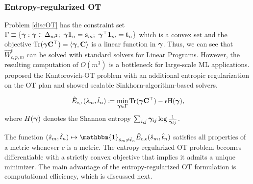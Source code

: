 \subsubsection{Entropy-regularized OT}\label{entOT} Problem \ref{discOT} has the constraint set $\Gamma\equiv \{ \bm{\gamma}: \bm{\gamma} \in \Delta_{m^2}; \ \bm{\gamma} \mathbf{1}_n = \mathbf{s}_m;\ \bm{\gamma}^\top \mathbf{1}_m = \mathbf{t}_n \}$ which is a convex set and the objective $\rm{Tr}(\bm{\gamma}\mathbf{C}^\top)=\langle \bm{\gamma}, \mathbf{C} \rangle$ is a linear function in $\bm{\gamma}$. Thus, we can see that $\widehat{W}^p_{c, p, m}$ can be solved with standard solvers for Linear Programs. However, the resulting computation of $O(m^3)$ \citep{peyre2019computational} is a bottleneck for large-scale ML applications. \cite{cuturi13a} proposed the Kantorovich-OT problem with an additional entropic regularization on the OT plan and showed scalable Sinkhorn-algorithm-based solvers.
\begin{definition}
\begin{equation}\label{entropyOT}
    \hat{E}_{c,\epsilon}(\hat{s}_m, \hat{t}_n)\coloneqq \min\limits_{\bm{\gamma}\in \Gamma} \rm{Tr}(\bm{\gamma}\mathbf{C}^\top) - \epsilon H(\bm{\gamma}),
\end{equation}
where $H(\bm{\gamma})$ denotes the Shannon entropy $\sum_{i, j}\bm{\gamma}_{ij}\log{\frac{1}{\bm{\gamma}_{ij}}}$.   
\end{definition}
The function $(\hat{s}_m, \hat{t}_n) \mapsto \mathbbm{1}_{\hat{s}_m\neq \hat{t}_n} \hat{E}_{c,\epsilon}(\hat{s}_m, \hat{t}_n)$ satisfies all properties of a metric whenever $c$ is a metric.
The entropy-regularized OT problem becomes differentiable with a strictly convex objective that implies it admits a unique minimizer. The main advantage of the entropy-regularized OT formulation is computational efficiency, which is discussed next.

